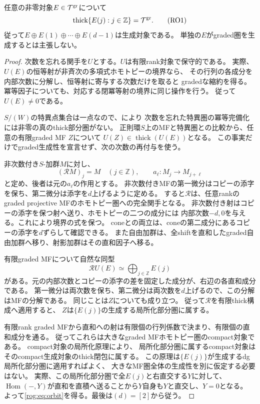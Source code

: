 \begin{theorem}[非零対象のシフト軌道は生成する]\label{rog:thm:orbit}
任意の非零対象$E\in\mathcal T^{\rm gr}$について
\[
 \operatorname{thick}\{E(j):j\in\mathbb Z\}=\mathcal T^{\rm gr}.
 \tag{RO1}\label{rog:eq:orbit}
\]
従って$E\oplus E(1)\oplus\cdots\oplus E(d-1)$は生成対象である。
単独の$E$がgraded圏を生成するとは主張しない。
\end{theorem}
\begin{proof}
次数を忘れる関手を$U$とする。$U$は有限rank対象で保守的である。
実際、$U(E)$の恒等射が非斉次の多項式ホモトピーの境界なら、
その行列の各成分を内部次数に分解し、恒等射に寄与する次数だけを取ると
gradedな縮約を得る。冪等因子についても、対応する閉冪等射の境界に同じ操作を行う。
従って$U(E)\ne0$である。

$S/(W)$の特異点集合は一点なので、\cite[Theorem~6.13]{ROGStevenson}により
次数を忘れた特異圏の冪等完備化には非零の真のthick部分圏がない。
正則環$S$上のMFと特異圏との比較から、任意の有限graded MF $Z$について
$U(Z)\in\operatorname{thick}(U(E))$となる。
この事実だけでgraded生成性を宣言せず、次の次数の再付与を使う。

非次数付き$S$-加群$M$に対し、
\[
 (\mathcal R M)_j=M\quad(j\in\mathbb Z),\qquad
 a_\ell:M_j\longrightarrow M_{j+\ell}
\]
と定め、後者は元の$a_\ell$の作用とする。
非次数付きMFの第一微分はコピーの添字を保ち、第二微分は添字を$d$上げるように定める。
すると$\mathcal R$は、任意rankのgraded projective MFのホモトピー圏への完全関手となる。
非次数付き射はコピーの添字を保つ射へ送り、ホモトピーの二つの成分には
内部次数$-d,0$を与える。これにより境界の式を保つ。
coneとの両立は、coneの第二成分にあるコピーの添字を$d$ずらして確認できる。
また自由加群は、全shiftを直和したgraded自由加群へ移り、射影加群はその直和因子へ移る。

有限graded MFについて自然な同型
\[
 \mathcal R U(E)\simeq\bigoplus_{j\in\mathbb Z}E(j)
 \tag{RO2}\label{rog:eq:regrading}
\]
がある。元の内部次数とコピーの添字の差を固定した成分が、右辺の各直和成分である。
第一微分は両次数を保ち、第二微分は両次数を$d$上げるので、この分解はMFの分解である。
同じことは$Z$についても成り立つ。
従って$\mathcal R$を有限thick構成へ適用すると、
$Z$は$\{E(j)\}$の生成する局所化部分圏に属する。

有限rank graded MFから直和への射は有限個の行列係数で決まり、有限個の直和成分を通る。
従ってこれらは大きなgraded MFホモトピー圏のcompact対象である。
compact対象の局所化原理\cite[\S13.37]{ROGStacks}により、
局所化部分圏に属するcompact対象はそのcompact生成対象のthick閉包に属する。
この原理は$\{E(j)\}$が生成するdg局所化部分圏に適用すればよく、
大きなMF圏全体の生成性を別に仮定する必要はない。
実際、この局所化部分圏で全$E(j)$と右直交する$Y$に対して、
$\operatorname{Hom}(-,Y)$が直和を直積へ送ることから$Y$自身も$Y$と直交し、$Y=0$となる。
よって\eqref{rog:eq:orbit}を得る。最後は$(d)=[2]$から従う。
\end{proof}

